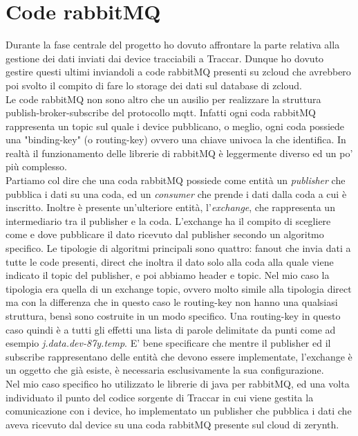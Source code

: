 \documentclass[a4paper,titlepage,12pt]{book}
\begin{document}
\section{\sffamily
Code rabbitMQ}
Durante la fase centrale del progetto ho dovuto affrontare la parte relativa alla gestione dei dati inviati dai device tracciabili a Traccar. Dunque ho dovuto gestire questi ultimi inviandoli a code rabbitMQ presenti su zcloud che avrebbero poi svolto il compito di fare lo storage dei dati sul database di zcloud.\\
Le code rabbitMQ non sono altro che un ausilio per realizzare la struttura publish-broker-subscribe del protocollo mqtt. Infatti ogni coda rabbitMQ rappresenta un topic sul quale i device pubblicano, o meglio, ogni coda possiede una "binding-key" (o routing-key) ovvero una chiave univoca la che identifica.
In realtà il funzionamento delle librerie di rabbitMQ è leggermente diverso ed un po' più complesso.\\
Partiamo col dire che una coda rabbitMQ possiede come entità un \textit{publisher} che pubblica i dati su una coda, ed un \textit{consumer} che prende i dati dalla coda a cui è inscritto. Inoltre è presente un'ulteriore entità, l'\textit{exchange}, che rappresenta un intermediario tra il publisher e la coda. L'exchange ha il compito di scegliere come e dove pubblicare il dato ricevuto dal publisher secondo un algoritmo specifico. Le tipologie di algoritmi principali sono quattro: fanout che invia dati a tutte le code presenti, direct che inoltra il dato solo alla coda alla quale viene indicato il topic del publisher, e poi abbiamo header e topic. Nel mio caso la tipologia era quella di un exchange topic, ovvero molto simile alla tipologia direct ma con la differenza che in questo caso le routing-key non hanno una qualsiasi struttura, bensì sono costruite in un modo specifico. Una routing-key in questo caso quindi è a tutti gli effetti una lista di parole delimitate da punti come ad esempio \textit{j.data.dev-87y.temp}.
E' bene specificare che mentre il publisher ed il subscribe rappresentano delle entità che devono essere implementate, l'exchange è un oggetto che già esiste, è necessaria esclusivamente la sua configurazione.\\
Nel mio caso specifico ho utilizzato le librerie di java per rabbitMQ, ed una volta individuato il punto del codice sorgente di Traccar in cui viene gestita la comunicazione con i device, ho implementato un publisher che pubblica i dati che aveva ricevuto dal device su una coda rabbitMQ presente sul cloud di zerynth.\\
\end{document}
